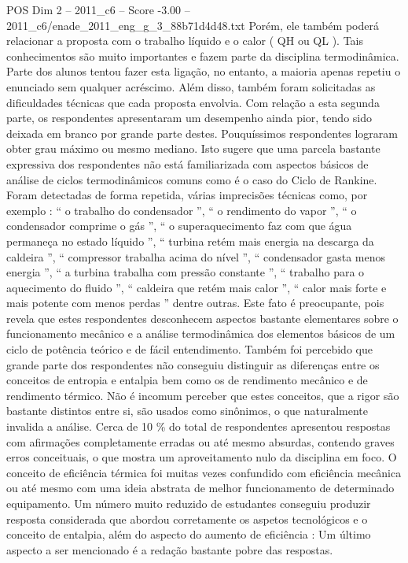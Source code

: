 \begin{textsample}{POS Dim 2 – 2011\_c6 – Score -3.00 – 2011\_c6/enade\_2011\_eng\_g\_3\_88b71d4d48.txt}
Porém, ele também poderá relacionar a proposta com o trabalho líquido e o calor ( QH ou QL ).
Tais conhecimentos são muito importantes e fazem parte da disciplina termodinâmica.
Parte dos alunos tentou fazer esta ligação, no entanto, a maioria apenas repetiu o enunciado sem qualquer acréscimo.
Além disso, também foram solicitadas as dificuldades técnicas que cada proposta envolvia.
Com relação a esta segunda parte, os respondentes apresentaram um desempenho ainda pior, tendo sido deixada em branco por grande parte destes.
Pouquíssimos respondentes lograram obter grau máximo ou mesmo mediano.
Isto sugere que uma parcela bastante expressiva dos respondentes não está familiarizada com aspectos básicos de análise de ciclos termodinâmicos comuns como é o caso do Ciclo de Rankine.
Foram detectadas de forma repetida, várias imprecisões técnicas como, por exemplo : “ o trabalho do condensador ”, “ o rendimento do vapor ”, “ o condensador comprime o gás ”, “ o superaquecimento faz com que água permaneça no estado líquido ”, “ turbina retém mais energia na descarga da caldeira ”, “ compressor trabalha acima do nível ”, “ condensador gasta menos energia ”, “ a turbina trabalha com pressão constante ”, “ trabalho para o aquecimento do fluido ”, “ caldeira que retém mais calor ”, “ calor mais forte e mais potente com menos perdas ” dentre outras.
Este fato é preocupante, pois revela que estes respondentes desconhecem aspectos bastante elementares sobre o funcionamento mecânico e a análise termodinâmica dos elementos básicos de um ciclo de potência teórico e de fácil entendimento.
Também foi percebido que grande parte dos respondentes não conseguiu distinguir as diferenças entre os conceitos de entropia e entalpia bem como os de rendimento mecânico e de rendimento térmico.
Não é incomum perceber que estes conceitos, que a rigor são bastante distintos entre si, são usados como sinônimos, o que naturalmente invalida a análise.
Cerca de 10 \% do total de respondentes apresentou respostas com afirmações completamente erradas ou até mesmo absurdas, contendo graves erros conceituais, o que mostra um aproveitamento nulo da disciplina em foco.
O conceito de eficiência térmica foi muitas vezes confundido com eficiência mecânica ou até mesmo com uma ideia abstrata de melhor funcionamento de determinado equipamento.
Um número muito reduzido de estudantes conseguiu produzir resposta considerada que abordou corretamente os aspetos tecnológicos e o conceito de entalpia, além do aspecto do aumento de eficiência : Um último aspecto a ser mencionado é a redação bastante pobre das respostas.

\end{textsample}
